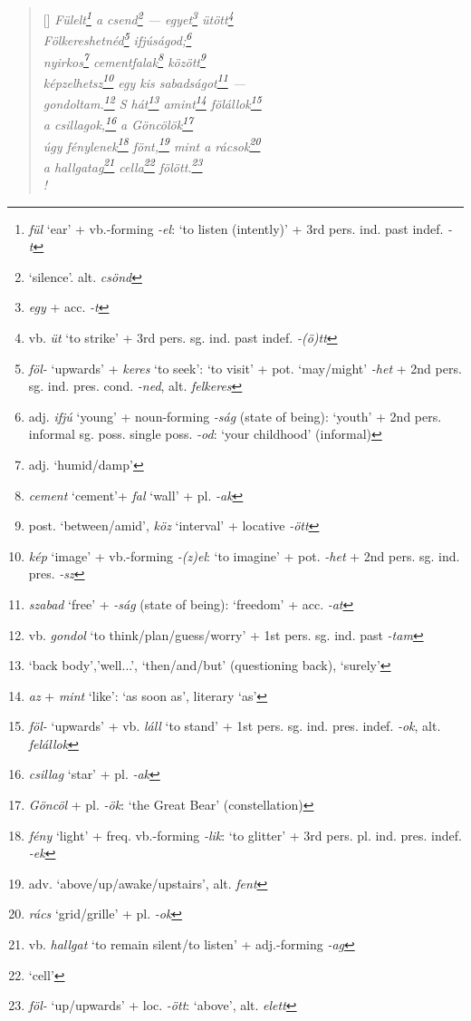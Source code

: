\documentclass[a4paper,12pt,twoside,final]{book}
\begin{document}
\begin{verse}[\versewidth]
  \it
  Fülelt\footnote{\emph{fül} `ear' + vb.-forming \emph{-el}: `to
  listen (intently)' + 3rd pers. ind. past indef. \emph{-t}} a
  csend\footnote{`silence'. alt. \emph{csönd}}
  --- egyet\footnote{\emph{egy} + acc. \emph{-t}}
  ütött\footnote{vb. \emph{üt} `to strike' + 3rd
  pers. sg. ind. past indef. \emph{-(ö)tt}} \\
  Fölkereshetnéd\footnote{\emph{föl-}
  `upwards' + \emph{keres} `to seek': `to visit' +
  pot. `may/might' \emph{-het} + 2nd
  pers. sg. ind. pres. cond. \emph{-ned}, alt. \emph{felkeres}}
  ifjúságod;\footnote{adj. \emph{ifjú} `young' + noun-forming
  \emph{-ság} (state of being): `youth' + 2nd pers. informal sg.
  poss. single poss. \emph{-od}: `your childhood' (informal)} \\
  nyirkos\footnote{adj. `humid/damp'}
  cementfalak\footnote{\emph{cement} `cement'+ \emph{fal} `wall' +
  pl. \emph{-ak}} között\footnote{post. `between/amid', \emph{köz}
  `interval' + locative \emph{-ött}} \\
  képzelhetsz\footnote{\emph{kép} `image' + vb.-forming
  \emph{-(z)el}: `to imagine' + pot. \emph{-het} + 2nd
  pers. sg. ind. pres. \emph{-sz}} egy kis
  sabadságot\footnote{\emph{szabad} `free' + \emph{-ság} (state of
  being): `freedom' + acc. \emph{-at}} --- \\
  gondoltam.\footnote{vb. \emph{gondol} `to
  think/plan/guess/worry' + 1st pers. sg. ind. past
  \emph{-tam}} S hát\footnote{`back body','well...',
  `then/and/but' (questioning back), `surely'}
  amint\footnote{\emph{az} + \emph{mint} `like': `as soon as',
  literary `as'} fölállok\footnote{\emph{föl-}
  `upwards' +  vb. \emph{láll} `to stand' + 1st
  pers. sg. ind. pres. indef. \emph{-ok}, alt. \emph{felállok}} \\
  a csillagok,\footnote{\emph{csillag} `star' + pl. \emph{-ak}} a
  Göncölök\footnote{\emph{Göncöl} + pl. \emph{-ök}: `the Great Bear'
  (constellation)} \\
  úgy fénylenek\footnote{\emph{fény} `light' + freq. vb.-forming
  \emph{-lik}: `to glitter' + 3rd
  pers. pl. ind. pres. indef. \emph{-ek}}
  fönt,\footnote{adv. `above/up/awake/upstairs', alt. \emph{fent}}
  mint a rácsok\footnote{\emph{rács} `grid/grille' + pl. \emph{-ok}} \\
  a hallgatag\footnote{vb. \emph{hallgat} `to remain silent/to
  listen' + adj.-forming \emph{-ag}} cella\footnote{`cell'}
  fölött.\footnote{\emph{föl-} `up/upwards' +  loc. \emph{-ött}:
  `above', alt. \emph{elett}} \\!
\end{verse}
\end{document}
